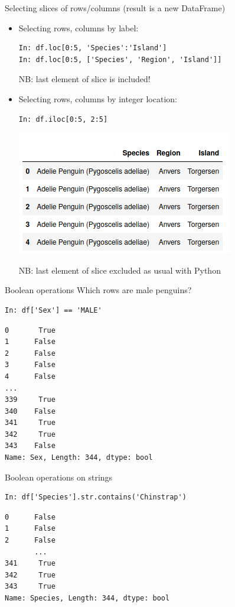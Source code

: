 \documentclass[aspectratio=169,usenames,dvipsnames]{beamer}
\begin{document}
\begin{frame}[fragile]{Selecting slices of rows/columns (result is a new DataFrame)}
    \begin{itemize}
        \item Selecting rows, columns by label:
\begin{lstlisting}
In: df.loc[0:5, 'Species':'Island']
In: df.loc[0:5, ['Species', 'Region', 'Island']]
\end{lstlisting}

            NB: last element of slice is included!

        \pause
        \item Selecting rows, columns by integer location:
\begin{lstlisting}
In: df.iloc[0:5, 2:5]
\end{lstlisting}

\vspace{-1em}
\includegraphics[height=0.4\textheight]{fig/penguinslice}

         NB: last element of slice excluded as usual with Python
    \end{itemize}

\end{frame}

\begin{frame}[fragile]{Boolean operations}
Which rows are male penguins?

\begin{lstlisting}
In: df['Sex'] == 'MALE'
\end{lstlisting}\vspace{-1em}\begin{lstlisting}[style=plain]
0       True
1      False
2      False
3      False
4      False
...  
339     True
340    False
341     True
342     True
343    False
Name: Sex, Length: 344, dtype: bool
\end{lstlisting}
\end{frame}

\begin{frame}[fragile]{Boolean operations on strings}
\begin{lstlisting}
In: df['Species'].str.contains('Chinstrap')
\end{lstlisting}\vspace{-1em}\begin{lstlisting}[style=plain]
0      False
1      False
2      False
       ...  
341     True
342     True
343     True
Name: Species, Length: 344, dtype: bool
\end{lstlisting}
\end{frame}
\end{document}

